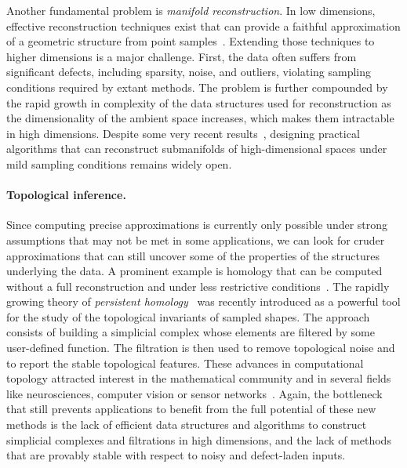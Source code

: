 Another fundamental problem is {\em manifold reconstruction}.  In low dimensions, effective reconstruction techniques exist that can provide a faithful approximation of a geometric structure from point samples~\cite{dey-csr-2007}. %
Extending those techniques to higher dimensions is a major challenge.  First, the data often suffers from significant defects, including sparsity, noise, and outliers, violating sampling conditions required by extant methods. The problem is further compounded by the rapid growth in complexity of the data structures used for reconstruction as the dimensionality of the ambient space increases, which makes them intractable in high dimensions.%
 Despite some very recent results~\cite{geometrica-7142i}, designing practical algorithms that can reconstruct submanifolds of high-dimensional spaces under mild sampling conditions remains widely open.  

\paragraph{Topological inference.}
Since computing precise approximations is currently only possible under strong assumptions that may not be met in some applications, we can look for cruder approximations 
that can still  uncover some of the properties of the structures underlying the data.
%
%
A prominent example is homology that can be computed  without a full reconstruction and under less restrictive conditions~\cite{geometrica-ccl09,nsw-fhm-2008}. The rapidly growing theory of {\em persistent homology}~\cite{eh-ph-2008,rg-bptd-2008} was recently introduced as a powerful tool for the study of the topological invariants of sampled shapes. The approach consists of building a simplicial complex whose elements are filtered by some user-defined function. The filtration is then used to remove topological noise and to report the stable topological features.  These advances in computational topology attracted interest in the mathematical community and in several fields like neurosciences, computer vision or sensor networks~\cite{cids-lbsni-2008,rg-bptd-2008}. Again, the bottleneck that still prevents applications to benefit from the full potential of these new methods is the lack of efficient data structures and algorithms to construct simplicial complexes and filtrations in high dimensions, and the lack of methods that are provably stable with respect to  noisy and defect-laden inputs.


